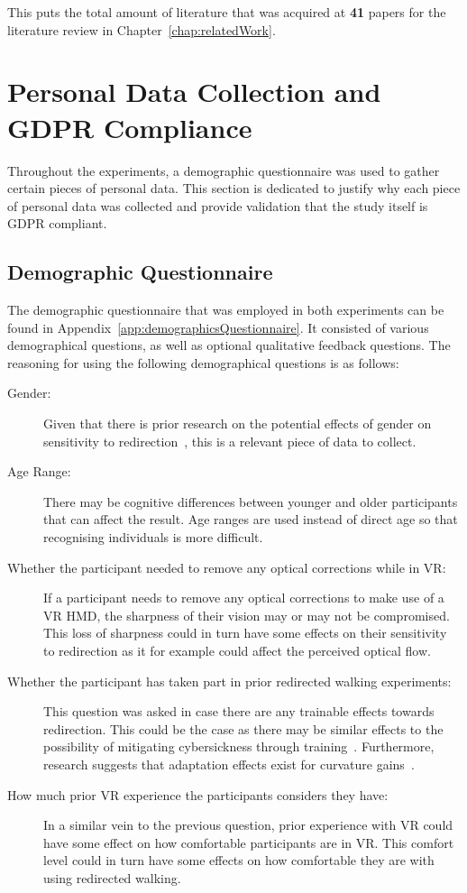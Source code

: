 This puts the total amount of literature that was acquired at \textbf{41} papers for the literature review in Chapter~\ref{chap:relatedWork}.

\section{Personal Data Collection and GDPR Compliance}
Throughout the experiments, a demographic questionnaire was used to gather certain pieces of personal data. This section is dedicated to justify why each piece of personal data was collected and provide validation that the study itself is GDPR compliant. 

\subsection{Demographic Questionnaire}
The demographic questionnaire that was employed in both experiments can be found in Appendix~\ref{app:demographicsQuestionnaire}. It consisted of various demographical questions, as well as optional qualitative feedback questions. The reasoning for using the following demographical questions is as follows:

\begin{description}
   \item[Gender:] Given that there is prior research on the potential effects of gender on sensitivity to redirection~\cite{nguyen2018individual}, this is a relevant piece of data to collect. 
   \item[Age Range:] There may be cognitive differences between younger and older participants that can affect the result. Age ranges are used instead of direct age so that recognising individuals is more difficult. 
   \item[Whether the participant needed to remove any optical corrections while in VR:] If a participant needs to remove any optical corrections to make use of a VR HMD, the sharpness of their vision may or may not be compromised. This loss of sharpness could in turn have some effects on their sensitivity to redirection as it for example could affect the perceived optical flow. 
   \item[Whether the participant has taken part in prior redirected walking experiments:] This question was asked in case there are any trainable effects towards redirection. This could be the case as there may be similar effects to the possibility of mitigating cybersickness through training~\cite{hildebrandt2018get}. Furthermore, research suggests that adaptation effects exist for curvature gains~\cite{nguyen2018individual}.
   \item[How much prior VR experience the participants considers they have:] In a similar vein to the previous question, prior experience with VR could have some effect on how comfortable participants are in VR. This comfort level could in turn have some effects on how comfortable they are with using redirected walking.
\end{description}

